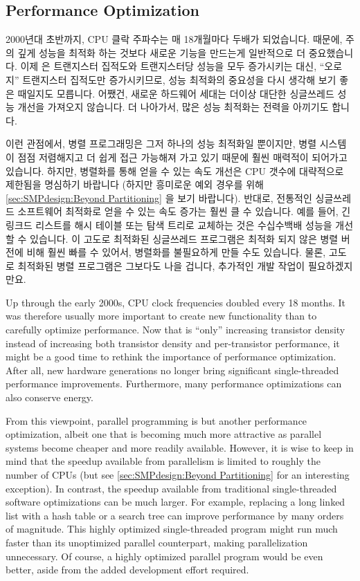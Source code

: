 \subsection{Performance Optimization}
\label{sec:intro:Performance Optimization}

2000년대 초반까지, CPU 클락 주파수는 매 18개월마다 두배가 되었습니다.
때문에, 주의 깊게 성능을 최적화 하는 것보다 새로운 기능을 만드는게 일반적으로
더 중요했습니다.
이제  은 트랜지스터 집적도와 트랜지스터당 성능을 모두
증가시키는 대신, ``오로지'' 트랜지스터 집적도만 증가시키므로, 성능 최적화의
중요성을 다시 생각해 보기 좋은 때일지도 모릅니다.
어쨌건, 새로운 하드웨어 세대는 더이상 대단한 싱글쓰레드 성능 개선을 가져오지
않습니다.
더 나아가서, 많은 성능 최적화는 전력을 아끼기도 합니다.

이런 관점에서, 병렬 프로그래밍은 그저 하나의 성능 최적화일 뿐이지만, 병렬
시스템이 점점 저렴해지고 더 쉽게 접근 가능해져 가고 있기 때문에 훨씬 매력적이
되어가고 있습니다.
하지만, 병렬화를 통해 얻을 수 있는 속도 개선은 CPU 갯수에 대략적으로 제한됨을
명심하기 바랍니다 (하지만 흥미로운 예외 경우를 위해
\cref{sec:SMPdesign:Beyond Partitioning} 을 보기 바랍니다).
반대로, 전통적인 싱글쓰레드 소프트웨어 최적화로 얻을 수 있는 속도 증가는 훨씬
클 수 있습니다.
예를 들어, 긴 링크드 리스트를 해시 테이블 또는 탐색 트리로 교체하는 것은
수십수백배 성능을 개선할 수 있습니다.
이 고도로 최적화된 싱글쓰레드 프로그램은 최적화 되지 않은 병렬 버전에 비해 훨씬
빠를 수 있어서, 병렬화를 불필요하게 만들 수도 있습니다.
물론, 고도로 최적화된 병렬 프로그램은 그보다도 나을 겁니다, 추가적인 개발
작업이 필요하겠지만요.

\iffalse

Up through the early 2000s, CPU clock frequencies doubled every 18 months.
It was therefore usually more important to create new functionality than to
carefully optimize performance.
Now that  is ``only'' increasing transistor density instead
of increasing both transistor density and per-transistor performance,
it might be a good time to rethink the importance of performance
optimization.
After all, new hardware generations no longer bring significant
single-threaded performance improvements.
Furthermore, many performance optimizations can also conserve energy.

From this viewpoint, parallel programming is but another performance
optimization, albeit one that is becoming much more attractive
as parallel systems become cheaper and more readily available.
However, it is wise to keep in mind that the speedup available from
parallelism is limited to roughly the number of CPUs
(but see \cref{sec:SMPdesign:Beyond Partitioning}
for an interesting exception).
In contrast, the speedup available from traditional single-threaded
software optimizations can be much larger.
For example, replacing a long linked list with a hash table
or a search tree can improve performance by many orders of magnitude.
This highly optimized single-threaded program might run much
faster than its unoptimized parallel counterpart, making parallelization
unnecessary.
Of course, a highly optimized parallel program would be even better,
aside from the added development effort required.

